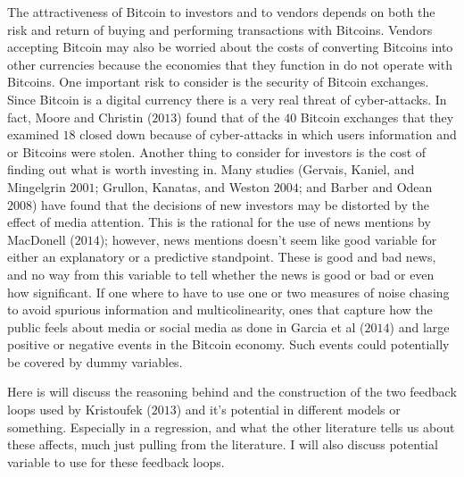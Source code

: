 \documentclass{article}[10 pt]
\newcommand{\vs}{\vspace{0.1in}}
\begin{document}
The attractiveness of Bitcoin to investors and to vendors depends on both
the risk and return of buying and performing transactions with Bitcoins.
Vendors accepting Bitcoin may also be worried about the costs of converting
Bitcoins into other currencies because the economies that they function in
do not operate with Bitcoins. One important risk to consider is the security
of Bitcoin exchanges. Since Bitcoin is a digital currency there is a very
real threat of cyber-attacks. In fact, Moore and Christin ($2013$) found
that of the $40$ Bitcoin exchanges that they examined $18$ closed down
because of cyber-attacks in which users information and or Bitcoins were
stolen. Another thing to consider for investors is the cost of finding out
what is worth investing in. Many studies (Gervais, Kaniel, and Mingelgrin
$2001$; Grullon, Kanatas, and Weston $2004$; and Barber and Odean $2008$)
have found that the decisions of new investors may be distorted by the
effect of media attention. This is the rational for the use of news mentions
by MacDonell ($2014$); however, news mentions doesn't seem like good variable
for either an explanatory or a predictive standpoint. These is good and bad
news, and no way from this variable to tell whether the news is good or bad
or even how significant. If one where to have to use one or two measures 
of noise chasing to avoid spurious information and multicolinearity, ones
that capture how the public feels about media or
social media as done in Garcia et al ($2014$) and large positive or negative 
events in the Bitcoin economy. Such events could potentially be covered
by dummy variables.

\vs

Here is will discuss the reasoning behind and the construction of the two
feedback loops used by Kristoufek ($2013$) and it's potential in different 
models or something. Especially in a regression, and what the other
literature tells us about these affects, much just pulling from the
literature. I will also discuss potential variable to use for these feedback
loops.

\vs
\end{document}
